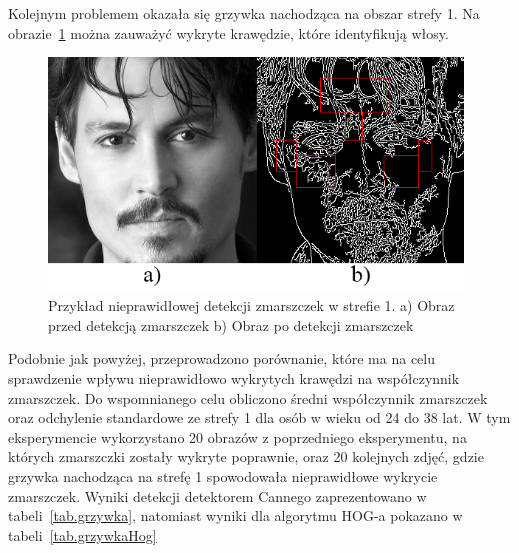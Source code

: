 \documentclass[a4paper,twoside,12pt]{book}
\begin{document}
    Kolejnym problemem okazała się grzywka nachodząca na obszar strefy 1.
    Na obrazie~\ref{fig.grzywka} można zauważyć wykryte krawędzie,
    które identyfikują włosy.
    \begin{figure}[hb]
        \centering
        \includegraphics[width=11cm]{Obrazy/zlyRyjekZGrzywka.jpg}
        \captionsetup{justification=centering}
        \caption{Przykład nieprawidłowej detekcji zmarszczek w strefie 1. \newline
        a) Obraz przed detekcją zmarszczek b) Obraz po detekcji zmarszczek }
        \label{fig.grzywka}
    \end{figure}
    Podobnie jak powyżej, przeprowadzono porównanie,
    które ma na celu sprawdzenie wpływu nieprawidłowo wykrytych krawędzi na współczynnik zmarszczek.
    Do wspomnianego celu obliczono średni współczynnik zmarszczek oraz odchylenie standardowe ze strefy 1 dla osób w
    wieku od 24 do 38 lat. W tym eksperymencie wykorzystano 20 obrazów z poprzedniego eksperymentu, na których
    zmarszczki zostały wykryte poprawnie, oraz 20 kolejnych zdjęć, gdzie grzywka nachodząca na strefę 1
    spowodowała nieprawidłowe wykrycie zmarszczek. Wyniki detekcji detektorem Cannego zaprezentowano w
    tabeli~\ref{tab.grzywka}, natomiast wyniki dla algorytmu HOG-a pokazano w tabeli~\ref{tab.grzywkaHog}
\end{document}
